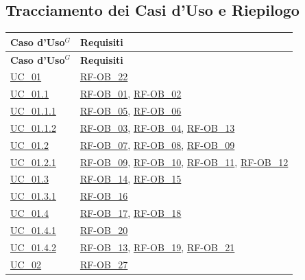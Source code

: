 \subsection{Tracciamento dei Casi d'Uso e Riepilogo}
\renewcommand{\arraystretch}{1.2}
\begin{longtable}{|
        >{\raggedright\arraybackslash}p{} |
        >{\raggedright\arraybackslash}p{} |
    }
    \hline
    \rowcolor[gray]{0.9}
    \textbf{Caso d'Uso$^G$} & \textbf{Requisiti} \\
    \hline
    \endfirsthead
    \hline
    \rowcolor[gray]{0.9}
    \textbf{Caso d'Uso$^G$} & \textbf{Requisiti} \\
    \hline
    \endhead
    \hyperref[uc_01]{UC\_01} & \hyperlink{rf-ob_22}{RF-OB\_22} \\
    \hline
    \hyperref[uc_01.1]{UC\_01.1} & \hyperlink{rf-ob_1}{RF-OB\_01}, \hyperlink{rf-ob_2}{RF-OB\_02} \\
    \hline
    \hyperref[uc_01.1.1]{UC\_01.1.1} & \hyperlink{rf-ob_5}{RF-OB\_05}, \hyperlink{rf-ob_6}{RF-OB\_06} \\
    \hline
    \hyperref[uc_01.1.2]{UC\_01.1.2} & \hyperlink{rf-ob_3}{RF-OB\_03}, \hyperlink{rf-ob_4}{RF-OB\_04}, \hyperlink{rf-ob_13}{RF-OB\_13} \\
    \hline
    \hyperref[uc_01.2]{UC\_01.2} & \hyperlink{rf-ob_7}{RF-OB\_07}, \hyperlink{rf-ob_8}{RF-OB\_08}, \hyperlink{rf-ob_9}{RF-OB\_09} \\
    \hline
    \hyperref[uc_01.2.1]{UC\_01.2.1} & \hyperlink{rf-ob_9}{RF-OB\_09}, \hyperlink{rf-ob_10}{RF-OB\_10}, \hyperlink{rf-ob_11}{RF-OB\_11}, \hyperlink{rf-ob_12}{RF-OB\_12} \\
    \hline
    \hyperref[uc_01.3]{UC\_01.3} & \hyperlink{rf-ob_14}{RF-OB\_14}, \hyperlink{rf-ob_15}{RF-OB\_15} \\
    \hline
    \hyperref[uc_01.3.1]{UC\_01.3.1} & \hyperlink{rf-ob_16}{RF-OB\_16} \\
    \hline
    \hyperref[uc_01.4]{UC\_01.4} & \hyperlink{rf-ob_17}{RF-OB\_17}, \hyperlink{rf-ob_18}{RF-OB\_18} \\
    \hline
    \hyperref[uc_01.4.1]{UC\_01.4.1} & \hyperlink{rf-ob_20}{RF-OB\_20} \\
    \hline
    \hyperref[uc_01.4.2]{UC\_01.4.2} & \hyperlink{rf-ob_13}{RF-OB\_13}, \hyperlink{rf-ob_19}{RF-OB\_19}, \hyperlink{rf-ob_21}{RF-OB\_21} \\
    \hline
    \hyperref[uc_02]{UC\_02} & \hyperlink{rf-ob_27}{RF-OB\_27} \\

\end{longtable}
